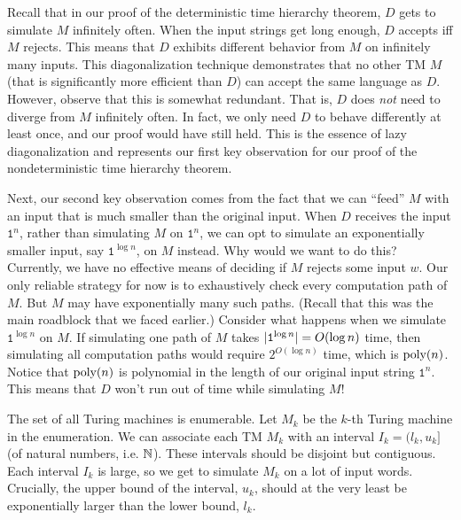 \begin{proofidea}
  Recall that in our proof of the deterministic time hierarchy theorem, $D$ gets to simulate $M$ infinitely often. When the input strings get long enough, $D$ accepts iff $M$ rejects. This means that $D$ exhibits different behavior from $M$ on infinitely many inputs. This diagonalization technique demonstrates that no other TM $M$ (that is significantly more efficient than $D$) can accept the same language as $D$. However, observe that this is somewhat redundant. That is, $D$ does \emph{not} need to diverge from $M$ infinitely often. In fact, we only need $D$ to behave differently at least once, and our proof would have still held. This is the essence of lazy diagonalization and represents our first key observation for our proof of the nondeterministic time hierarchy theorem.

  Next, our second key observation comes from the fact that we can ``feed'' $M$ with an input that is much smaller than the original input. When $D$ receives the input $\texttt{1}^n$, rather than simulating $M$ on $\texttt{1}^n$, we can opt to simulate an exponentially smaller input, say $\texttt{1}^{\log n}$, on $M$ instead. Why would we want to do this? Currently, we have no effective means of deciding if $M$ rejects some input $w$. Our only reliable strategy for now is to exhaustively check every computation path of $M$. But $M$ may have exponentially many such paths. (Recall that this was the main roadblock that we faced earlier.) Consider what happens when we simulate $\texttt{1}^{\log n}$ on $M$. If simulating one path of $M$ takes $| \texttt{1}^{\log n} | = O(\log n)$ time, then simulating all computation paths would require $2^{O(\log n)}$ time, which is $\text{poly}(n)$. Notice that $\text{poly}(n)$ is polynomial in the length of our original input string $\texttt{1}^n$. This means that $D$ won't run out of time while simulating $M$!

  The set of all Turing machines is enumerable. Let $M_k$ be the $k$-th Turing machine in the enumeration. We can associate each TM $M_k$ with an interval $I_k = (l_k, u_k]$ (of natural numbers, i.e. $\mathbb N$). These intervals should be disjoint but contiguous. Each interval $I_k$ is large, so we get to simulate $M_k$ on a lot of input words. Crucially, the upper bound of the interval, $u_k$, should at the very least be exponentially larger than the lower bound, $l_k$.


\end{proofidea}
